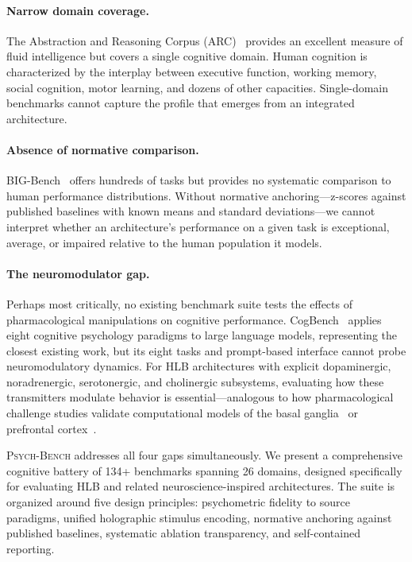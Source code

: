 \documentclass[11pt,letterpaper]{article}
\newcommand{\psychbench}{\textsc{Psych-Bench}}
\newcommand{\hlb}{\textsc{HLB}}
\begin{document}
\paragraph{Narrow domain coverage.} The Abstraction and Reasoning Corpus (ARC)~\citep{chollet2019measure} provides an excellent measure of fluid intelligence but covers a single cognitive domain. Human cognition is characterized by the interplay between executive function, working memory, social cognition, motor learning, and dozens of other capacities. Single-domain benchmarks cannot capture the profile that emerges from an integrated architecture.

\paragraph{Absence of normative comparison.} BIG-Bench~\citep{srivastava2023beyond} offers hundreds of tasks but provides no systematic comparison to human performance distributions. Without normative anchoring---z-scores against published baselines with known means and standard deviations---we cannot interpret whether an architecture's performance on a given task is exceptional, average, or impaired relative to the human population it models.

\paragraph{The neuromodulator gap.} Perhaps most critically, no existing benchmark suite tests the effects of pharmacological manipulations on cognitive performance. CogBench~\citep{codaforno2024cogbench} applies eight cognitive psychology paradigms to large language models, representing the closest existing work, but its eight tasks and prompt-based interface cannot probe neuromodulatory dynamics. For \hlb{} architectures with explicit dopaminergic, noradrenergic, serotonergic, and cholinergic subsystems, evaluating how these transmitters modulate behavior is essential---analogous to how pharmacological challenge studies validate computational models of the basal ganglia~\citep{doya2002metalearning} or prefrontal cortex~\citep{arnsten2011catecholamine}.

\psychbench{} addresses all four gaps simultaneously. We present a comprehensive cognitive battery of 134+ benchmarks spanning 26 domains, designed specifically for evaluating \hlb{} and related neuroscience-inspired architectures. The suite is organized around five design principles: psychometric fidelity to source paradigms, unified holographic stimulus encoding, normative anchoring against published baselines, systematic ablation transparency, and self-contained reporting.
\end{document}

